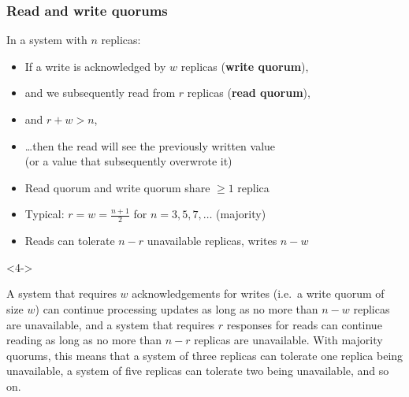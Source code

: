 \begin{frame}
    \label{s:quorum}
    \frametitle{Read and write quorums}
    In a system with $n$ replicas:
    \begin{itemize}
        \item If a write is acknowledged by $w$ replicas (\textbf{write quorum}),
        \item<2-> and we subsequently read from $r$ replicas (\textbf{read quorum}),
        \item<2-> and $r+w>n$,
        \item<3-> {\dots}then the read will see the previously written value\\(or a value that subsequently overwrote it)
        \item<4-> Read quorum and write quorum share $\ge 1$ replica
        \item<5-> Typical: $r=w=\frac{n+1}{2}$ for $n=3,5,7,\dots$ (majority)
        \item<5-> Reads can tolerate $n-r$ unavailable replicas, writes $n-w$
    \end{itemize}
    \begin{uncoverenv}<4->
        \begin{center}
        \end{center}
    \end{uncoverenv}
\end{frame}
\label{l:quorum}

A system that requires $w$ acknowledgements for writes (i.e.\ a write quorum of size $w$) can continue processing updates as long as no more than $n-w$ replicas are unavailable, and a system that requires $r$ responses for reads can continue reading as long as no more than $n-r$ replicas are unavailable.
With majority quorums, this means that a system of three replicas can tolerate one replica being unavailable, a system of five replicas can tolerate two being unavailable, and so on.

